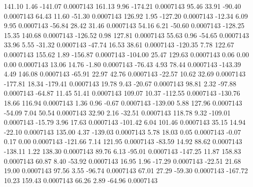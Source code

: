       141.10        1.46     -141.07     0.0007143
      161.13        9.96     -174.21     0.0007143
       95.46       33.91      -90.40     0.0007143
       64.43       11.60      -51.30     0.0007143
      126.92        1.95     -127.20     0.0007143
      -12.34        6.09        9.95     0.0007143
      -56.84       28.42       31.46     0.0007143
       54.16        6.21      -50.60     0.0007143
     -128.25       15.35      140.68     0.0007143
     -126.52        0.98      127.81     0.0007143
       55.63        0.96      -54.65     0.0007143
       33.96        5.55      -31.32     0.0007143
      -47.74       16.53       38.61     0.0007143
     -120.35        7.78      122.67     0.0007143
      155.62        1.89     -156.87     0.0007143
     -104.00       25.47      129.63     0.0007143
        0.06        0.00        0.00     0.0007143
       13.06       14.76       -1.80     0.0007143
      -76.43        4.93       78.44     0.0007143
     -143.39        4.49      146.08     0.0007143
      -65.91       22.97       42.76     0.0007143
      -22.57       10.62       32.69     0.0007143
     -177.81       18.34     -179.41     0.0007143
       19.78        9.43      -20.67     0.0007143
       98.81        2.32      -97.88     0.0007143
      -64.87       11.45       51.41     0.0007143
      109.07       10.37     -112.55     0.0007143
     -130.76       18.66      116.94     0.0007143
        1.36        0.96       -0.67     0.0007143
     -139.00        5.88      127.96     0.0007143
      -54.09        7.04       50.54     0.0007143
       32.90        2.16      -32.51     0.0007143
      118.78        9.32     -109.01     0.0007143
      -15.79        3.96       17.63     0.0007143
     -101.42        6.04      101.46     0.0007143
       35.15       14.94      -22.10     0.0007143
      135.00        4.37     -139.03     0.0007143
        5.78       18.03        0.05     0.0007143
       -0.07        0.17        0.00     0.0007143
     -121.66        7.14      121.95     0.0007143
      -83.59       14.92       88.62     0.0007143
     -138.11        1.22      138.30     0.0007143
       89.76        6.13      -95.01     0.0007143
     -147.25       11.87      158.83     0.0007143
       60.87        8.40      -53.92     0.0007143
       16.95        1.96      -17.29     0.0007143
      -22.51       21.68       19.00     0.0007143
       97.56        3.55      -96.74     0.0007143
       67.01       27.29      -59.30     0.0007143
     -167.72       10.23      159.43     0.0007143
       66.26        2.89      -64.96     0.0007143
